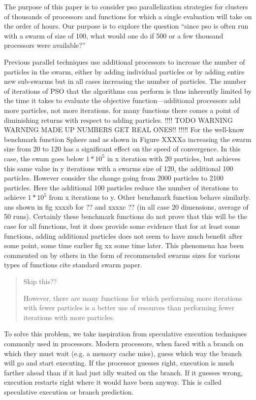 \documentclass[journal,letterpaper]{IEEEtran}
\begin{document}
The purpose of this paper is to consider pso parallelization strategies for
clusters of thousands of processors and functions for which a single
evaluation will take on the order of hours.
Our purpose is to explore the question ``since pso is often run with
a swarm of size of 100, what would one do if 500 or a few thousand processors were available?''

Previous parallel techniques use additional processors to increase the
number of particles in the swarm, either by adding individual particles or by
adding entire new sub-swarms but in all cases increasing the number of particles.  The number of iterations of PSO that the
algorithms can perform is thus inherently limited by the time it takes to
evaluate the objective function---additional processors add more particles, not
more iterations.
for many functions there comes a point of diminishing returns with respect to adding particles.
!!!! TODO WARNING WARNING MADE UP NUMBERS GET REAL ONES!! !!!!!
For the well-know benchmark function Sphere and as shown in Figure XXXXa increasing the swarm size from 20 to 120 has a significant effect on the 
speed of convergence. In this case, the swam goes below $1*10^5$ in x iteration with 20 particles, but 
achieves this same value in  y iterations with a swarms size of 120, the additional 100 particles.
However consider the change going from 2000 particles to 2100 particles. Here the additional 100 particles
reduce the number of iterations to achieve $1*10^5$ from x iterations to y.
Other benchmark function behave similarly. ans shown in fig xxxxb for ?? and xxxxc ?? (in all case 20 dimensions, average of 50 runs).
Certainly these benchmark functions do not prove that this will be the case for all functions,
but it does provide some evidence that for at least some functions, adding additional particles does not seem to have much benefit
after some point, some time earlier fig xx some time later. This phenomena has been commented on by others
in the form of recommended swarms sizes for various types of functions cite standard swarm paper.
\begin{quote}
Skip this??

However, there are many functions for which performing more
iterations with fewer particles is a better use of resources than performing
fewer iterations with more particles.  
\end{quote}

To solve this problem, we take inspiration from speculative execution
techniques commonly used in processors.  Modern processors, when faced with a
branch on which they must wait (e.g. a memory cache miss), guess which way the
branch will go and start executing.  If the processor guesses right, execution
is much farther ahead than if it had just idly waited on the branch.  If it
guesses wrong, execution restarts right where it would have been anyway.  This
is called speculative execution or branch prediction.
\end{document}
